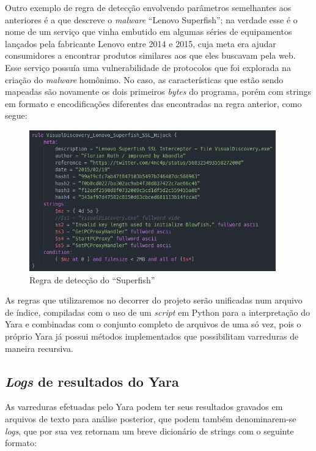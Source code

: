 Outro exemplo de regra de detecção envolvendo parâmetros semelhantes aos
anteriores é a que descreve o \textit{malware} ``Lenovo
Superfish''\citeyear{lenovosuperfish}; na verdade esse é o nome de um serviço
que vinha embutido em algumas séries de equipamentos lançados pela fabricante
Lenovo entre 2014 e 2015, cuja meta era ajudar consumidores a encontrar produtos
similares aos que eles buscavam pela web. Esse serviço possuía uma
vulnerabilidade de protocolos que foi explorada na criação do \textit{malware}
homônimo. No caso, as características que estão sendo mapeadas são novamente os
dois primeiros \textit{bytes} do programa, porém com strings em formato e
encodificações diferentes das encontradas na regra anterior, como segue:

\begin{figure}[H]
	\centering
	\includegraphics[width=0.95\textwidth]{figs/superfish}
	\caption{Regra de detecção do ``Superfish''}
	\label{f.superfish}
\end{figure}

As regras que utilizaremos no decorrer do projeto serão unificadas num arquivo
de índice, compiladas com o uso de um \textit{script} em Python para a
interpretação do Yara e combinadas com o conjunto completo de arquivos de uma só
vez, pois o próprio Yara já possui métodos implementados que possibilitam
varreduras de maneira recursiva.

\subsection{\textit{Logs} de resultados do Yara} %
\label{sub:logs_de_resultados_do_yara}

As varreduras efetuadas pelo Yara podem ter seus resultados gravados em arquivos
de texto para análise posterior, que podem também denominarem-se
\textit{logs}, que por sua vez retornam um  breve dicionário de strings com o seguinte
formato:

